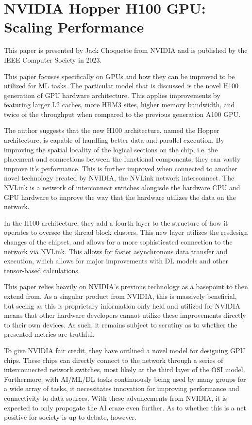 \section{NVIDIA  Hopper H100 GPU: Scaling Performance}\label{sec:paper2}

This paper is presented by Jack Choquette from NVIDIA and is published by the IEEE Computer Society in 2023.

This paper focuses specifically on GPUs and how they can be improved to be utilized for ML tasks.
The particular model that is discussed is the novel H100 generation of GPU hardware architecture.
This applies improvements by featuring larger L2 caches, more HBM3 sites, higher memory bandwidth, and twice of the throughput when compared to the previous generation A100 GPU.

The author suggests that the new H100 architecture, named the Hopper architecture, is capable of handling better data and parallel execution.
By improving the spatial locality of the logical sections on the chip, i.e. the placement and connections between the functional components, they can vastly improve it's performance.
This is further improved when connected to another novel technology created by NVIDIA, the NVLink network interconnect.
The NVLink is a network of interconnect switches alongisde the hardware CPU and GPU hardware to improve the way that the hardware utilizes the data on the network.

In the H100 architecture, they add a fourth layer to the structure of how it operates to oversee the thread block clusters.
This new layer utilizes the resdesign changes of the chipset, and allows for a more sophisticated connection to the network via NVLink. 
This allows for faster asynchronous data transfer and execution, which allows for major improvements with DL models and other tensor-based calculations.

This paper relies heavily on NVIDIA's previous technology as a basepoint to then extend from.
As a singular product from NVIDIA, this is massively beneficial, but seeing as this is proprietary information only held and utilized for NVIDIA  means that other hardware developers cannot utilize these improvements directly to their own devices.
As such, it remains subject to scrutiny as to whether the presented metrics are truthful.

To give NVIDIA fair credit, they have outlined a novel model for designing GPU chips.
These chips can directly connect to the network through a series of interconnected network switches, most likely at the third layer of the OSI model.
Furthermore, with AI/ML/DL tasks continuously being used by many groups for a wide array of tasks, it necessitates innovation for improving performance and connectivity to data sources.
With these advancements from NVIDIA, it is expected to only propogate the AI craze even further.
As to whether this is a net positive for society is up to debate, however.